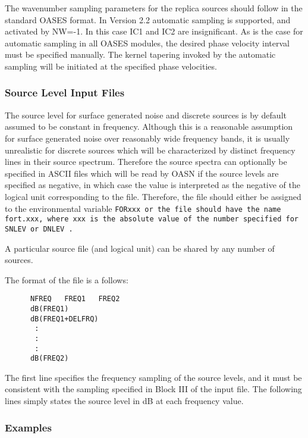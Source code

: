 The wavenumber sampling parameters for the replica sources should
follow in the standard OASES format. In Version 2.2 automatic sampling
is supported, and activated by NW=-1. In this case IC1 and IC2 are
insignificant. As is the case for automatic sampling in all OASES
modules, the desired phase velocity interval must be specified
manually. The kernel tapering invoked by the automatic sampling will
be initiated at the specified phase velocities.



\subsubsection{Source Level Input Files}
\label{sec:slevf}

The source level for surface generated noise and discrete sources is
by default assumed to be constant in frequency. Although this is a
reasonable assumption for surface generated noise over reasonably wide
frequency bands, it is usually unrealistic for discrete sources which
will be characterized by distinct frequency lines in their source
spectrum. Therefore the source spectra can optionally be specified in
ASCII files which will be read by OASN if the source levels are
specified as negative, in which case the value is interpreted as the
negative of the logical unit corresponding to the file. Therefore, the
file should either be assigned to the environmental
variable \tt FORxxx \rm or the file should have the name \tt
fort.xxx\rm, where \tt xxx \rm is the absolute value of the number
specified for \tt SNLEV \rm or \tt DNLEV \rm.

A particular source file (and logical unit) can be shared by any
number of sources.

The format of the file is a follows:

\small
\begin{verbatim}
      NFREQ   FREQ1   FREQ2
      dB(FREQ1)
      dB(FREQ1+DELFRQ)
       :
       :
       :
      dB(FREQ2) 
\end{verbatim}
\normalsize

The first line specifies the frequency sampling of the source levels,
and it must be consistent with the sampling specified in Block III of
the input file. The following lines simply states the source level in dB at
each frequency value. 

\subsubsection{Examples}
\label{sec:oasnex}

